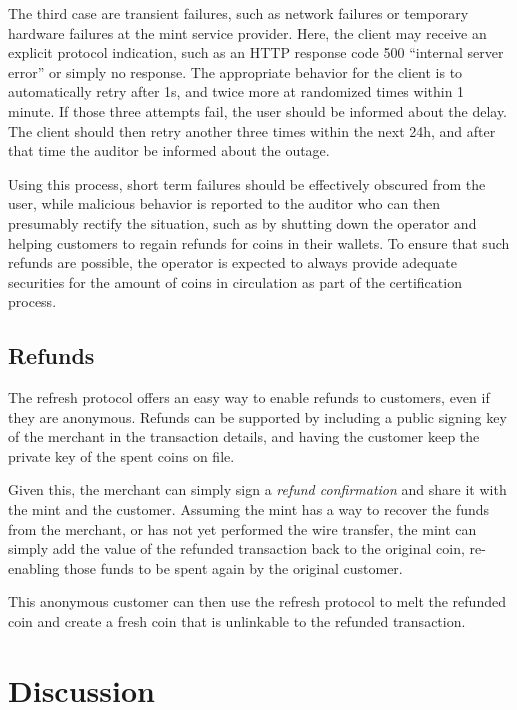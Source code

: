 \documentclass{llncs}
\begin{document}
The third case are transient failures, such as network failures or
temporary hardware failures at the mint service provider.  Here, the
client may receive an explicit protocol indication, such as an HTTP
response code 500 ``internal server error'' or simply no response.
The appropriate behavior for the client is to automatically retry
after 1s, and twice more at randomized times within 1 minute. 
If those three attempts fail, the user should be informed about the
delay.  The client should then retry another three times within the
next 24h, and after that time the auditor be informed about the outage.

Using this process, short term failures should be effectively obscured
from the user, while malicious behavior is reported to the auditor who
can then presumably rectify the situation, such as by shutting down
the operator and helping customers to regain refunds for coins in 
their wallets.  To ensure that such refunds are possible, the operator
is expected to always provide adequate securities for the amount of
coins in circulation as part of the certification process.

\subsection{Refunds}

The refresh protocol offers an easy way to enable refunds to
customers, even if they are anonymous.  Refunds can be supported
by including a public signing key of the merchant in the transaction
details, and having the customer keep the private key of the spent
coins on file.

Given this, the merchant can simply sign a {\em refund confirmation}
and share it with the mint and the customer.  Assuming the mint has
a way to recover the funds from the merchant, or has not yet performed
the wire transfer, the mint can simply add the value of the refunded
transaction back to the original coin, re-enabling those funds to be 
spent again by the original customer.

This anonymous customer can then use the refresh protocol to melt the
refunded coin and create a fresh coin that is unlinkable to the 
refunded transaction.


\section{Discussion}
\end{document}
